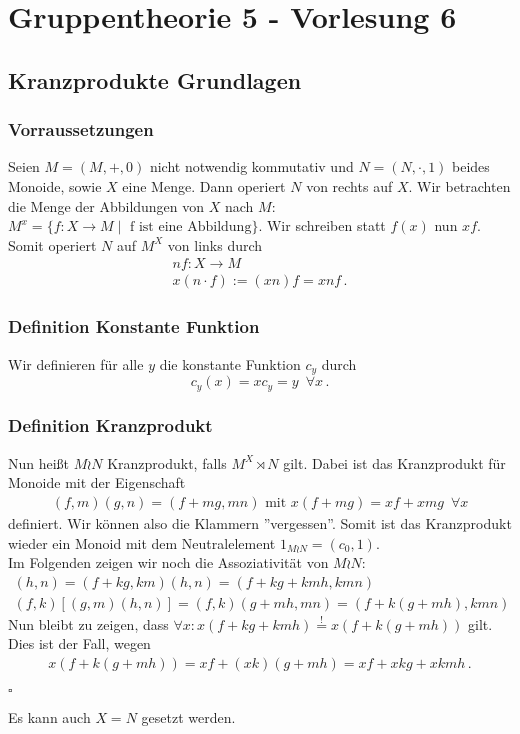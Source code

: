 \documentclass[12pt, german]{article}
\newcommand{\bewiesen}{
	
	\begin{flushright}
		$\square$  \\
\end{flushright}}
\begin{document}
	\section{Gruppentheorie 5 - Vorlesung 6}
	\subsection{Kranzprodukte Grundlagen}
	\subsubsection{Vorraussetzungen}
	Seien $M = (M, +, 0)$ nicht notwendig kommutativ und $N=(N, \cdot, 1)$ beides Monoide, sowie $X$ eine Menge. 
	Dann operiert $N$ von rechts auf $X$. Wir betrachten die Menge der Abbildungen von $X$ nach $M$: $M^x = \{ f: X \to M \mid \text{ f ist eine Abbildung} \}$. Wir schreiben statt $f(x)$ nun $xf$. 
	Somit operiert $N$ auf $M^X$ von links durch
	\begin{align*}
		nf : X \to M \\ 
		x(n\cdot f) := (xn)f = xnf \, .
	\end{align*}
	\subsubsection{Definition Konstante Funktion}
	Wir definieren für alle $y$ die konstante Funktion $c_y$ durch	$$c_y(x) = xc_y = y \, \, \, \forall x\, .$$ 
	
	\subsubsection{Definition Kranzprodukt}
	Nun hei\ss t $M \wr N$ Kranzprodukt, falls $M^X \rtimes N$ gilt. Dabei ist das Kranzprodukt für Monoide mit der Eigenschaft
	\begin{align*}
		(f,m)(g,n) = (f + mg, mn) \text{ mit } x(f+mg) = xf + xmg \, \, \, \forall x
	\end{align*}
	definiert.
	Wir können also die Klammern ''vergessen''. Somit ist das Kranzprodukt wieder ein Monoid mit dem Neutralelement $1_{M \wr N}= (c_0,1)$.
	\\
	Im Folgenden zeigen wir noch die Assoziativität von $M \wr N$:
	\begin{align*}
		[(f,k)(g,m)](h,n) = (f +kg, km)(h,n) = (f +kg + kmh, kmn) \\
		(f,k)[(g,m)(h,n)] = (f,k)(g +mh, mn) = (f + k ( g +mh),kmn) 
	\end{align*}
	Nun bleibt zu zeigen, dass $\forall x : x(f+kg + kmh) \overset{!}{=} x(f+k(g+mh))$ gilt. \\
	Dies ist der Fall, wegen 
	\begin{align*}
		x(f+k(g+mh)) = xf+(xk)(g + mh) = xf + xkg + xkmh\, .
	\end{align*}
	\bewiesen
	Es kann auch $X=N$ gesetzt werden.
	
\end{document}
